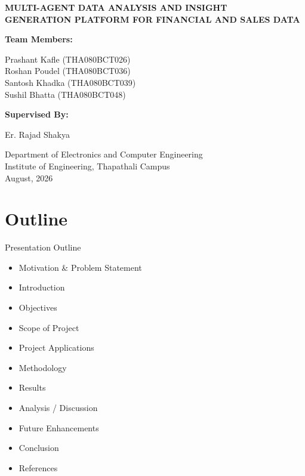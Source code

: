 \documentclass[10pt,aspectratio=43]{beamer}
\newcommand{\presentationdate}{August, 2026}
\begin{document}
\begin{frame}[plain,t]
\centering
\vspace{3mm}
{\bfseries\fontsize{18}{22}\selectfont MULTI-AGENT DATA ANALYSIS AND INSIGHT\\GENERATION PLATFORM FOR FINANCIAL AND SALES DATA\par}
\vspace{5mm}
{\bfseries\fontsize{11}{14}\selectfont Team Members:\par}
\vspace{1mm}
{\fontsize{10}{13}\selectfont
Prashant Kafle (THA080BCT026)\\
Roshan Poudel (THA080BCT036)\\
Santosh Khadka (THA080BCT039)\\
Sushil Bhatta (THA080BCT048)\par}
\vspace{4mm}
{\bfseries\fontsize{11}{14}\selectfont Supervised By:\par}
{\fontsize{10}{13}\selectfont Er. Rajad Shakya\par}
\vspace{7mm}
{\fontsize{9}{12}\selectfont Department of Electronics and Computer Engineering\\
Institute of Engineering, Thapathali Campus\\
\presentationdate\par}
\end{frame}

\section{Outline}
\begin{frame}{Presentation Outline}
\begin{itemize}
  \item Motivation \& Problem Statement 
  \item Introduction
  \item Objectives
  \item Scope of Project
  \item Project Applications
  \item Methodology
  \item Results
  \item Analysis / Discussion
  \item Future Enhancements
  \item Conclusion
  \item References
\end{itemize}
\end{frame}
\end{document}
